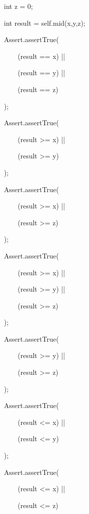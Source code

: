 \documentclass{article}
\newenvironment{tmindent}{\begin{tmparmod}{1.5em}{0pt}{0pt} }{\end{tmparmod}}
\newenvironment{tmparmod}[3]{\begin{list}{}{\setlength{\topsep}{0pt}\setlength{\leftmargin}{#1}\setlength{\rightmargin}{#2}\setlength{\parindent}{#3}\setlength{\listparindent}{\parindent}\setlength{\itemindent}{\parindent}\setlength{\parsep}{\parskip}} \item[]}{\end{list}}
\newenvironment{tmparsep}[1]{\begingroup\setlength{\parskip}{#1}}{\endgroup}
\begin{document}
\begin{example}
\begin{tmindent}
\begin{tmparsep}{0em}
      \ \ \ \ \ \ \ int z = 0;
      
      \ \ \ \ \ \ \ int result = self.mid(x,y,z);
      
      \ \ \ \ \ \ \ Assert.assertTrue(
      
      \ \ \ \ \ \ \ \ \ \ \ (result == x) ||
      
      \ \ \ \ \ \ \ \ \ \ \ (result == y) ||
      
      \ \ \ \ \ \ \ \ \ \ \ (result == z)
      
      \ \ \ \ \ \ \ );
      
      \ \ \ \ \ \ \ Assert.assertTrue(
      
      \ \ \ \ \ \ \ \ \ \ \ (result >= x) ||
      
      \ \ \ \ \ \ \ \ \ \ \ (result >= y)
      
      \ \ \ \ \ \ \ );
      
      \ \ \ \ \ \ \ Assert.assertTrue(
      
      \ \ \ \ \ \ \ \ \ \ \ (result >= x) ||
      
      \ \ \ \ \ \ \ \ \ \ \ (result >= z)
      
      \ \ \ \ \ \ \ );
      
      \ \ \ \ \ \ \ Assert.assertTrue(
      
      \ \ \ \ \ \ \ \ \ \ \ (result >= x) ||
      
      \ \ \ \ \ \ \ \ \ \ \ (result >= y) ||
      
      \ \ \ \ \ \ \ \ \ \ \ (result >= z)
      
      \ \ \ \ \ \ \ );
      
      \ \ \ \ \ \ \ Assert.assertTrue(
      
      \ \ \ \ \ \ \ \ \ \ \ (result >= y) ||
      
      \ \ \ \ \ \ \ \ \ \ \ (result >= z)
      
      \ \ \ \ \ \ \ );
      
      \ \ \ \ \ \ \ Assert.assertTrue(
      
      \ \ \ \ \ \ \ \ \ \ \ (result <= x) ||
      
      \ \ \ \ \ \ \ \ \ \ \ (result <= y)
      
      \ \ \ \ \ \ \ );
      
      \ \ \ \ \ \ \ Assert.assertTrue(
      
      \ \ \ \ \ \ \ \ \ \ \ (result <= x) ||
      
      \ \ \ \ \ \ \ \ \ \ \ (result <= z)
      

\end{tmparsep}
\end{tmindent}
\end{example}
\end{document}
